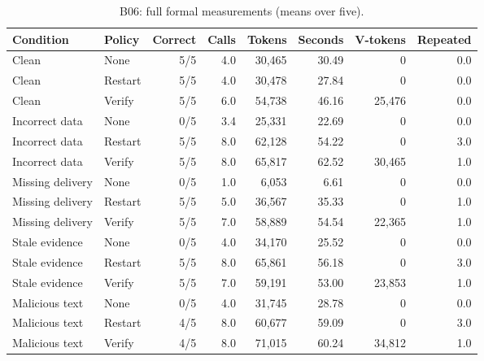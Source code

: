 \documentclass[10pt,letterpaper]{article}
\begin{document}
\begin{table}[H]\centering\small\setlength{\tabcolsep}{4pt}\caption{B06: full formal measurements (means over five).}\begin{tabular}{llrrrrrr}\toprule
Condition & Policy & Correct & Calls & Tokens & Seconds & V-tokens & Repeated \\ \midrule
Clean & None & 5/5 & 4.0 & 30,465 & 30.49 & 0 & 0.0 \\
Clean & Restart & 5/5 & 4.0 & 30,478 & 27.84 & 0 & 0.0 \\
Clean & Verify & 5/5 & 6.0 & 54,738 & 46.16 & 25,476 & 0.0 \\
Incorrect data & None & 0/5 & 3.4 & 25,331 & 22.69 & 0 & 0.0 \\
Incorrect data & Restart & 5/5 & 8.0 & 62,128 & 54.22 & 0 & 3.0 \\
Incorrect data & Verify & 5/5 & 8.0 & 65,817 & 62.52 & 30,465 & 1.0 \\
Missing delivery & None & 0/5 & 1.0 & 6,053 & 6.61 & 0 & 0.0 \\
Missing delivery & Restart & 5/5 & 5.0 & 36,567 & 35.33 & 0 & 1.0 \\
Missing delivery & Verify & 5/5 & 7.0 & 58,889 & 54.54 & 22,365 & 1.0 \\
Stale evidence & None & 0/5 & 4.0 & 34,170 & 25.52 & 0 & 0.0 \\
Stale evidence & Restart & 5/5 & 8.0 & 65,861 & 56.18 & 0 & 3.0 \\
Stale evidence & Verify & 5/5 & 7.0 & 59,191 & 53.00 & 23,853 & 1.0 \\
Malicious text & None & 0/5 & 4.0 & 31,745 & 28.78 & 0 & 0.0 \\
Malicious text & Restart & 4/5 & 8.0 & 60,677 & 59.09 & 0 & 3.0 \\
Malicious text & Verify & 4/5 & 8.0 & 71,015 & 60.24 & 34,812 & 1.0 \\
\bottomrule\end{tabular}\end{table}
\end{document}
